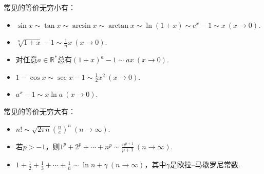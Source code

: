 常见的等价无穷小有：
\begin{itemize}
	\item \(\sin x%
		\sim \tan x%
		\sim \arcsin x%
		\sim \arctan x%
		\sim \ln(1+x)%
		\sim e^x-1%
		\sim x\ (x\to0)\).
	\item \(\sqrt[n]{1+x} - 1 \sim \frac1n x\ (x\to0)\).
	\item 对任意\(a\in\mathbb{R}^*\)总有\((1+x)^a-1 \sim ax\ (x\to0)\).
	\item \(1-\cos x%
		\sim \sec x-1%
		\sim \frac12 x^2\ (x\to0)\).
	\item \(a^x-1 \sim x \ln a\ (x\to0)\).
\end{itemize}

常见的等价无穷大有：
\begin{itemize}
	\item \(n! \sim \sqrt{2 \pi n} \left( \frac{n}{e} \right)^n\ (n\to\infty)\).
	\item 若\(p>-1\)，则\(1^p+2^p+\dotsb+n^p \sim \frac{n^{p+1}}{p+1}\ (n\to\infty)\).%
	\item \(1+\frac12+\frac13+\dotsb+\frac1n \sim \ln n + \gamma\ (n\to\infty)\)，其中\(\gamma\)是欧拉--马歇罗尼常数.%
\end{itemize}

